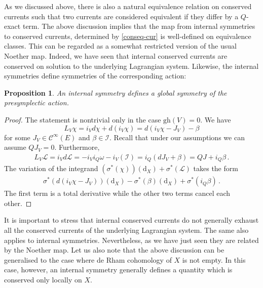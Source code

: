 \documentclass[a4paper,12pt]{article}
\numberwithin{equation}{section} %
\newtheorem{prop}[thm]{Proposition}
\newcommand{\gh}[1]{\mathrm{gh}(#1)}
\newcommand{\dx}{\mathrm{d}_X}
\newcommand{\cC}{\mathcal{C}}
\def\cI{\mathcal{I}}
\def\cL{\mathcal{L}}
\begin{document}
As we discussed above, there is also a natural equivalence relation on conserved currents such that two currents are considered equivalent if they differ by a $Q$-exact term. The above discussion implies that the map from internal symmetries to conserved currents, determined by \eqref{conseq-cur} is well-defined on equivalence classes. This can be regarded as a somewhat restricted version of the usual Noether map. Indeed, we have seen that internal conserved currents are conserved on solution to the underlying Lagrangian system. Likewise, the internal symmetries define symmetries of the corresponding action:
\begin{prop}
    An internal symmetry defines a global symmetry of the presymplectic action. 
\end{prop}
\begin{proof}
    The statement is nontrivial only in the case $\gh{V}=0$.   We have
\begin{equation}
    L_{V} \chi = i_{V} d \chi + d(i_{V}\chi) = d(i_{V}\chi - J_V) - \beta 
\end{equation}
for some $J_V\in \cC^\infty(E)$ and $\beta \in \cI$. Recall that under our assumptions we can assume $QJ_V=0$. Furthermore, 
\begin{equation}
\begin{gathered}
    L_{V} \cL = i_{V}d\cL = -i_{V} i_Q \omega - i_{V}(\cI) = i_Q(dJ_V + \beta ) = QJ + i_Q\beta\,.
\end{gathered}
\end{equation}
The variation of the integrand $(\sigma^*(\chi))(\dx)+\sigma^*(\cL)$ takes the form
\begin{equation} 
\begin{gathered}
    \sigma^*(d(i_{V}\chi - J_V))(\dx)  - \sigma^*(\beta)(\dx) + \sigma^*(i_Q\beta) \,.
\end{gathered}
\end{equation} 
The first term is a total derivative while the other two terms cancel each other. 
\end{proof}
It is important to stress that internal conserved currents do not generally exhaust all the conserved currents of the underlying Lagrangian system. The same also applies to internal symmetries. Nevertheless, as we have just seen they are related by the Noether map. Let us also note that the above discussion can be generalised to the case where de Rham cohomology of $X$ is not empty. In this case, however, an internal symmetry generally defines a quantity which is conserved only locally on $X$.
\end{document}
